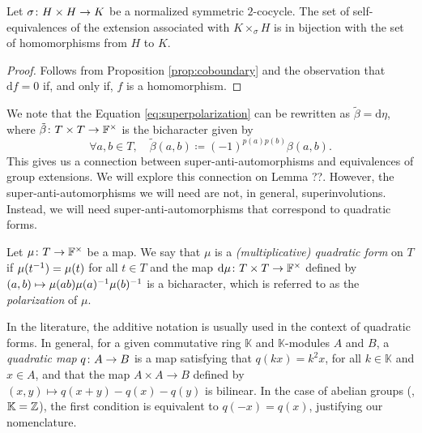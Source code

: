 \begin{cor}\label{cor:self-equivalences-are-homomorphisms}
    Let $\sigma \colon H\times H \to K$ be a normalized symmetric $2$-cocycle. 
    The set of self-equivalences of the extension associated with $K \times_\sigma H$ is in bijection with the set of homomorphisms from $H$ to $K$.
\end{cor}

\begin{proof}
    Follows from Proposition \ref{prop:coboundary} and the observation that $\mathrm{d}f = 0$ if, and only if, $f$ is a homomorphism.
\end{proof}

We note that the Equation \eqref{eq:superpolarization} can be rewritten as $\tilde\beta = \mathrm{d}\eta$, where $\tilde\beta\colon T\times T \to \mathbb{F}^\times$ is the bicharacter given by
\begin{equation}\label{eq:def-beta-tilde}
    \forall a,b\in T,\quad \tilde\beta(a,b) \coloneqq (-1)^{p(a)p(b)}\beta(a,b).
\end{equation}
This gives us a connection between super-anti-automorphisms and equivalences of group extensions. 
We will explore this connection on Lemma ??.  However, the super-anti-automorphisms we will need are not, in general, superinvolutions. 
Instead, we will need super-anti-automorphisms that correspond to quadratic forms.

\begin{defi}
    Let $\mu\colon T \to \mathbb{F}^\times$ be a map. 
    We say that $\mu$ is a \emph{(multiplicative) quadratic form} on $T$ if $\mu(t^{-1}) = \mu (t)$ for all $t\in T$ and the map $\mathrm{d}\mu\colon T\times T \to \mathbb{F}^\times$ defined by
    $(a,b) \mapsto \mu(ab) \mu(a)^{-1} \mu(b)^{-1}$
    is a bicharacter, which is referred to as the \emph{polarization} of $\mu$.
\end{defi}

\begin{remark}
    In the literature, the additive notation is usually used in the context of quadratic forms. 
    In general, for a given commutative ring $\mathbb K$ and $\mathbb K$-modules $A$ and $B$, a \emph{quadratic map} $q\colon A \to B$ is a map satisfying that $q(kx) = k^2 x$, for all $k\in \mathbb K$ and $x \in A$, and that the map $A \times A \to B$ defined by $(x,y) \mapsto q(x+y) - q(x) - q(y)$ is bilinear. 
    In the case of abelian groups (\ie, $\mathbb K = \mathbb{Z}$), the first condition is equivalent to $q(-x) = q(x)$, justifying our nomenclature.
\end{remark}

